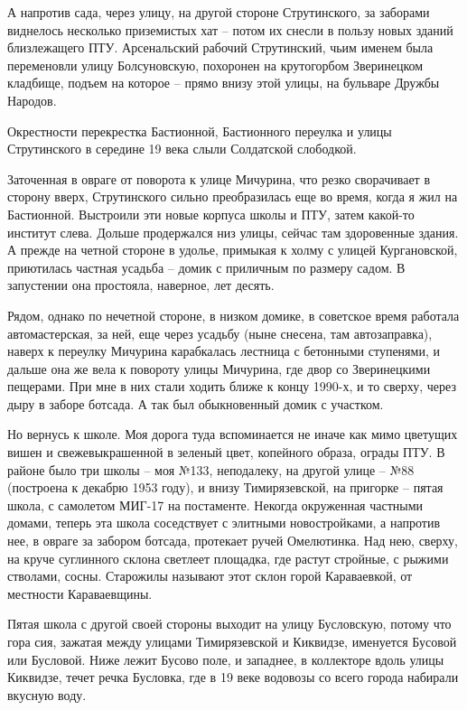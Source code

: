 А напротив сада, через улицу, на другой стороне Струтинского, за заборами виднелось несколько приземистых хат – потом их снесли в пользу новых зданий близлежащего ПТУ. Арсенальский рабочий Струтинский, чьим именем была переменовли улицу Болсуновскую, похоронен на крутогорбом Зверинецком кладбище, подъем на которое – прямо внизу этой улицы, на бульваре Дружбы Народов.

Окрестности перекрестка Бастионной, Бастионного переулка и улицы Струтинского в середине 19 века слыли Солдатской слободкой.

Заточенная в овраге от поворота к улице Мичурина, что резко сворачивает в сторону вверх, Струтинского сильно преобразилась еще во время, когда я жил на Бастионной. Выстроили эти новые корпуса школы и ПТУ, затем какой-то институт слева. Дольше продержался низ улицы, сейчас там здоровенные здания. А прежде на четной стороне в удолье, примыкая к холму с улицей Кургановской, приютилась частная усадьба – домик с приличным по размеру садом. В запустении она простояла, наверное, лет десять.

Рядом, однако по нечетной стороне, в низком домике, в советское время работала автомастерская, за ней, еще через усадьбу (ныне снесена, там автозаправка), наверх к переулку Мичурина карабкалась лестница с бетонными ступенями, и дальше она же вела к повороту улицы Мичурина, где двор со Зверинецкими пещерами. При мне в них стали ходить ближе к концу 1990-х, и то сверху, через дыру в заборе ботсада. А так был обыкновенный домик с участком.

Но вернусь к школе. Моя дорога туда вспоминается не иначе как мимо цветущих вишен и свежевыкрашенной в зеленый цвет, копейного образа, ограды ПТУ. В районе было три школы – моя №133, неподалеку, на другой улице – №88 (построена к декабрю 1953 году), и внизу Тимирязевской, на пригорке – пятая школа, с самолетом МИГ-17 на постаменте. Некогда окруженная частными домами, теперь эта школа соседствует с элитными новостройками, а напротив нее, в овраге за забором ботсада, протекает ручей Омелютинка. Над нею, сверху, на круче суглинного склона светлеет площадка, где растут стройные, с рыжими стволами, сосны. Старожилы называют этот склон горой Караваевкой, от местности Караваевщины.

Пятая школа с другой своей стороны выходит на улицу Бусловскую, потому что гора сия, зажатая между улицами Тимирязевской и Киквидзе, именуется Бусовой или Бусловой. Ниже лежит Бусово поле, и западнее, в коллекторе вдоль улицы Киквидзе, течет речка Бусловка, где в 19 веке водовозы со всего города набирали вкусную воду.

